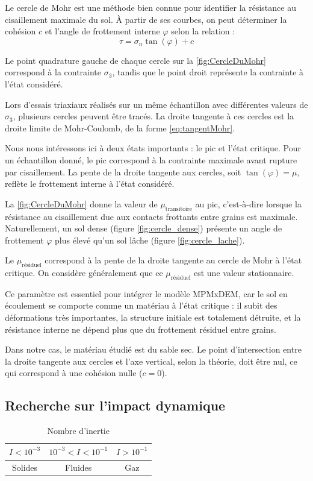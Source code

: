 \documentclass[a4paper,12pt]{report}
\begin{document}
Le cercle de Mohr est une méthode bien connue pour identifier la résistance au cisaillement maximale du sol.  
À partir de ses courbes, on peut déterminer la cohésion $c$ et l’angle de frottement interne $\varphi$ selon la relation :
\begin{equation}
    \tau = \sigma_n \tan(\varphi) + c
    \label{eq:tangentMohr}
\end{equation}

Le point quadrature gauche de chaque cercle sur la \autoref{fig:CercleDuMohr} correspond à la contrainte $\sigma_3$, tandis que le point droit représente la contrainte à l’état considéré.  

Lors d’essais triaxiaux réalisés sur un même échantillon avec différentes valeurs de $\sigma_3$, plusieurs cercles peuvent être tracés. La droite tangente à ces cercles est la droite limite de Mohr-Coulomb, de la forme \eqref{eq:tangentMohr}.  

Nous nous intéressons ici à deux états importants : le pic et l’état critique.  
Pour un échantillon donné, le pic correspond à la contrainte maximale avant rupture par cisaillement.  
La pente de la droite tangente aux cercles, soit $\tan(\varphi) = \mu$, reflète le frottement interne à l’état considéré.  

La \autoref{fig:CercleDuMohr} donne la valeur de $\mu_{\text{transitoire}}$ au pic, c’est-à-dire lorsque la résistance au cisaillement due aux contacts frottants entre grains est maximale.  
Naturellement, un sol dense (figure \ref{fig:cercle_dense}) présente un angle de frottement $\varphi$ plus élevé qu’un sol lâche (figure \ref{fig:cercle_lache}).  

Le $\mu_{\text{résiduel}}$ correspond à la pente de la droite tangente au cercle de Mohr à l’état critique.  
On considère généralement que ce $\mu_{\text{résiduel}}$ est une valeur stationnaire.  

Ce paramètre est essentiel pour intégrer le modèle MPMxDEM, car le sol en écoulement se comporte comme un matériau à l’état critique :  
il subit des déformations très importantes, la structure initiale est totalement détruite, et la résistance interne ne dépend plus que du frottement résiduel entre grains.  

Dans notre cas, le matériau étudié est du sable sec. Le point d’intersection entre la droite tangente aux cercles et l’axe vertical, selon la théorie, doit être nul, ce qui correspond à une cohésion nulle ($c=0$).

\subsection{Recherche sur l'impact dynamique}
\begin{table}[h!]
\centering
\begin{tabular}{|c|c|c|}
\hline
$ I < 10^{-3} $ & $ 10^{-3} < I < 10^{-1} $ & $ I > 10^{-1} $ \\ 
\hline
Solides & Fluides & Gaz \\  
\hline
\end{tabular}
\caption{Nombre d’inertie}
\label{tab:nombreInertie}
\end{table}
\end{document}
